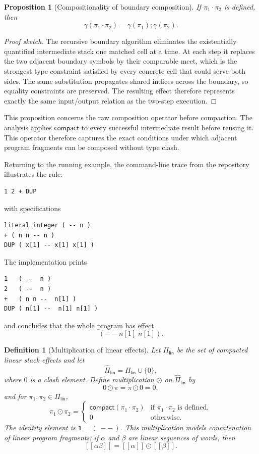 \documentclass[acmsmall,screen,review,anonymous,nonacm]{acmart}
\newtheorem{definition}{Definition}
\newtheorem{proposition}{Proposition}
\newcommand{\compose}{\mathbin{\cdot}}
\newcommand{\compact}{\mathsf{compact}}
\newcommand{\id}{\mathbf{1}}
\newcommand{\sem}[1]{[\![#1]\!]}
\begin{document}
\begin{proposition}[Compositionality of boundary composition]
If $\pi_1 \compose \pi_2$ is defined, then
\[
\gamma(\pi_1 \compose \pi_2) = \gamma(\pi_1) ; \gamma(\pi_2).
\]
\end{proposition}

\begin{proof}[Proof sketch]
The recursive boundary algorithm eliminates the existentially quantified intermediate
stack one matched cell at a time. At each step it replaces the two adjacent boundary
symbols by their comparable meet, which is the strongest type constraint satisfied by
every concrete cell that could serve both sides. The same substitution propagates shared
indices across the boundary, so equality constraints are preserved. The resulting effect
therefore represents exactly the same input/output relation as the two-step execution.
\end{proof}

This proposition concerns the raw composition operator before compaction. The analysis
applies $\compact$ to every successful intermediate result before reusing it.
This operator therefore captures the exact conditions under which adjacent program
fragments can be composed without type clash.

Returning to the running example, the command-line trace from the repository illustrates
the rule:
\begin{lstlisting}
1 2 + DUP
\end{lstlisting}
with specifications
\begin{lstlisting}
literal integer ( -- n )
+ ( n n -- n )
DUP ( x[1] -- x[1] x[1] )
\end{lstlisting}
The implementation prints
\begin{lstlisting}
1   ( --  n )
2   ( --  n )
+   ( n n --  n[1] )
DUP ( n[1] --  n[1] n[1] )
\end{lstlisting}
and concludes that the whole program has effect
\[
( -- n[1]\;n[1]).
\]

\begin{definition}[Multiplication of linear effects]
Let $\Pi_{\mathsf{lin}}$ be the set of compacted linear stack effects and let
\[
\widehat{\Pi}_{\mathsf{lin}} = \Pi_{\mathsf{lin}} \cup \{0\},
\]
where $0$ is a clash element. Define multiplication $\odot$ on $\widehat{\Pi}_{\mathsf{lin}}$ by
\[
0 \odot \pi = \pi \odot 0 = 0,
\]
and for $\pi_1,\pi_2 \in \Pi_{\mathsf{lin}}$,
\[
\pi_1 \odot \pi_2 =
\begin{cases}
\compact(\pi_1 \compose \pi_2) & \text{if } \pi_1 \compose \pi_2 \text{ is defined},\\
0 & \text{otherwise.}
\end{cases}
\]
The identity element is $\id = (\, -- \,)$. This multiplication models concatenation of linear program fragments: if $\alpha$ and $\beta$ are linear sequences of words, then
\[
\sem{\alpha\beta} = \sem{\alpha} \odot \sem{\beta}.
\]
\end{definition}
\end{document}
